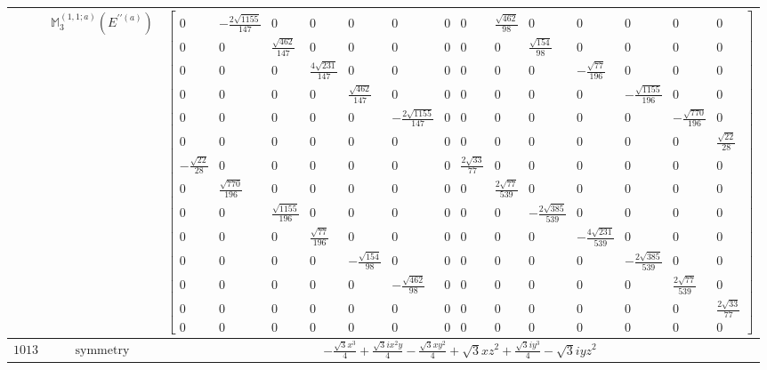 \documentclass[fleqn,8pt,landscape]{jsarticle}
\begin{document}
\begin{longtable}{ccc}
$  $ & $ \mathbb{M}_{3}^{(1,1;a)}(E^{\prime\prime(a)}) $ & $ \begin{bmatrix} 0 & - \frac{2 \sqrt{1155}}{147} & 0 & 0 & 0 & 0 & 0 & 0 & \frac{\sqrt{462}}{98} & 0 & 0 & 0 & 0 & 0 \\ 0 & 0 & \frac{\sqrt{462}}{147} & 0 & 0 & 0 & 0 & 0 & 0 & \frac{\sqrt{154}}{98} & 0 & 0 & 0 & 0 \\ 0 & 0 & 0 & \frac{4 \sqrt{231}}{147} & 0 & 0 & 0 & 0 & 0 & 0 & - \frac{\sqrt{77}}{196} & 0 & 0 & 0 \\ 0 & 0 & 0 & 0 & \frac{\sqrt{462}}{147} & 0 & 0 & 0 & 0 & 0 & 0 & - \frac{\sqrt{1155}}{196} & 0 & 0 \\ 0 & 0 & 0 & 0 & 0 & - \frac{2 \sqrt{1155}}{147} & 0 & 0 & 0 & 0 & 0 & 0 & - \frac{\sqrt{770}}{196} & 0 \\ 0 & 0 & 0 & 0 & 0 & 0 & 0 & 0 & 0 & 0 & 0 & 0 & 0 & \frac{\sqrt{22}}{28} \\ - \frac{\sqrt{22}}{28} & 0 & 0 & 0 & 0 & 0 & 0 & \frac{2 \sqrt{33}}{77} & 0 & 0 & 0 & 0 & 0 & 0 \\ 0 & \frac{\sqrt{770}}{196} & 0 & 0 & 0 & 0 & 0 & 0 & \frac{2 \sqrt{77}}{539} & 0 & 0 & 0 & 0 & 0 \\ 0 & 0 & \frac{\sqrt{1155}}{196} & 0 & 0 & 0 & 0 & 0 & 0 & - \frac{2 \sqrt{385}}{539} & 0 & 0 & 0 & 0 \\ 0 & 0 & 0 & \frac{\sqrt{77}}{196} & 0 & 0 & 0 & 0 & 0 & 0 & - \frac{4 \sqrt{231}}{539} & 0 & 0 & 0 \\ 0 & 0 & 0 & 0 & - \frac{\sqrt{154}}{98} & 0 & 0 & 0 & 0 & 0 & 0 & - \frac{2 \sqrt{385}}{539} & 0 & 0 \\ 0 & 0 & 0 & 0 & 0 & - \frac{\sqrt{462}}{98} & 0 & 0 & 0 & 0 & 0 & 0 & \frac{2 \sqrt{77}}{539} & 0 \\ 0 & 0 & 0 & 0 & 0 & 0 & 0 & 0 & 0 & 0 & 0 & 0 & 0 & \frac{2 \sqrt{33}}{77} \\ 0 & 0 & 0 & 0 & 0 & 0 & 0 & 0 & 0 & 0 & 0 & 0 & 0 & 0 \end{bmatrix} $ \\ \hline
$ 1013 $ & $ \text{symmetry} $ & $ - \frac{\sqrt{3} x^{3}}{4} + \frac{\sqrt{3} i x^{2} y}{4} - \frac{\sqrt{3} x y^{2}}{4} + \sqrt{3} x z^{2} + \frac{\sqrt{3} i y^{3}}{4} - \sqrt{3} i y z^{2} $ \\

\end{longtable}
\end{document}
